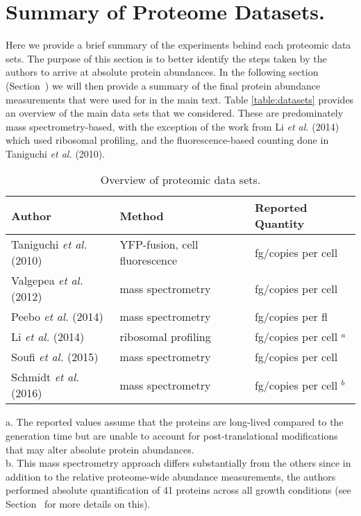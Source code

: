

\section{Summary of Proteome Datasets.}
\label{sec:SI_exp_summary}

Here we provide a brief summary of the experiments behind each proteomic data
sets. The purpose of this section is to better identify the steps taken by the
authors to arrive at absolute protein abundances. In the following section
(Section~) we will then provide a summary of the
final protein abundance measurements that were used for in the main text. Table
\ref{table:datasets} provides an overview of the main data sets that we
considered. These are predominately mass spectrometry-based, with the exception
of the work from Li \textit{et al.} (2014) which used ribosomal profiling, and
the fluorescence-based counting done in Taniguchi \textit{et al.} (2010).

\begin{table}[bt]
\caption{\label{tab:datasets}Overview of proteomic data sets.}
\begin{tabular}{l l l }
\toprule
Author & Method & Reported Quantity \\
\midrule
Taniguchi \textit{et al.} (2010)  & YFP-fusion, cell fluorescence    & fg/copies per cell      \\
Valgepea \textit{et al.} (2012)   & mass spectrometry                & fg/copies per cell      \\
Peebo \textit{et al.} (2014)      & mass spectrometry                & fg/copies per fl        \\
Li \textit{et al.} (2014)         & ribosomal profiling              & fg/copies per cell $^a$ \\
Soufi \textit{et al.} (2015)      & mass spectrometry                & fg/copies per cell      \\
Schmidt \textit{et al.} (2016)    & mass spectrometry                & fg/copies per cell $^b$ \\
\bottomrule
\end{tabular}

\medskip
a. The reported values assume that the proteins are long-lived compared to the
generation time but are unable to account for post-translational modifications
that may alter absolute protein abundances.
\\
b. This mass spectrometry approach differs substantially from the others since
in addition to the relative proteome-wide abundance measurements, the authors
performed absolute quantification of 41 proteins across all growth conditions
(see Section~ for more details on this).
\end{table}


